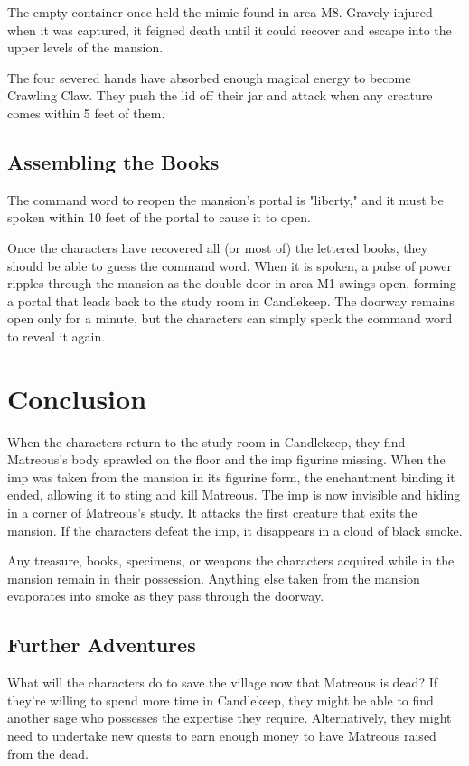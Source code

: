 \documentclass[10pt,a4paper,twoside,bg=print,twocolumn,openany,nodeprecatedcode]{dndbook}
\begin{document}
The empty container once held the mimic found in area M8. Gravely injured when it was captured, it feigned death until it could recover and escape into the upper levels of the mansion.

The four severed hands have absorbed enough magical energy to become Crawling Claw. They push the lid off their jar and attack when any creature comes within 5 feet of them.

\subsection{Assembling the Books}
The command word to reopen the mansion's portal is "liberty," and it must be spoken within 10 feet of the portal to cause it to open.

Once the characters have recovered all (or most of) the lettered books, they should be able to guess the command word. When it is spoken, a pulse of power ripples through the mansion as the double door in area M1 swings open, forming a portal that leads back to the study room in Candlekeep. The doorway remains open only for a minute, but the characters can simply speak the command word to reveal it again.

\section{Conclusion}
When the characters return to the study room in Candlekeep, they find Matreous's body sprawled on the floor and the imp figurine missing. When the imp was taken from the mansion in its figurine form, the enchantment binding it ended, allowing it to sting and kill Matreous. The imp is now invisible and hiding in a corner of Matreous's study. It attacks the first creature that exits the mansion. If the characters defeat the imp, it disappears in a cloud of black smoke.

Any treasure, books, specimens, or weapons the characters acquired while in the mansion remain in their possession. Anything else taken from the mansion evaporates into smoke as they pass through the doorway.

\subsection{Further Adventures}
What will the characters do to save the village now that Matreous is dead? If they're willing to spend more time in Candlekeep, they might be able to find another sage who possesses the expertise they require. Alternatively, they might need to undertake new quests to earn enough money to have Matreous raised from the dead.
\end{document}
